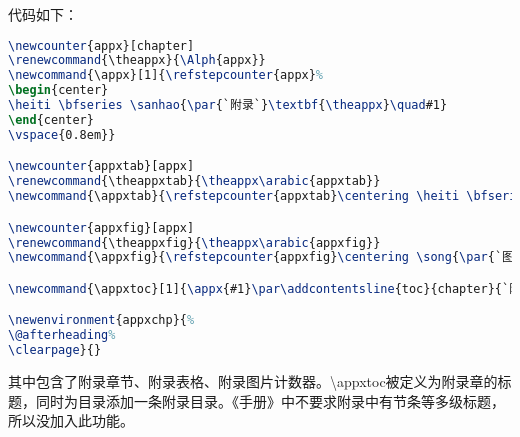 代码如下：

\begin{lstlisting}[language=TeX]
\newcounter{appx}[chapter]
\renewcommand{\theappx}{\Alph{appx}}
\newcommand{\appx}[1]{\refstepcounter{appx}%
\begin{center}
\heiti \bfseries \sanhao{\par{`附录`}\textbf{\theappx}\quad#1}
\end{center}
\vspace{0.8em}}

\newcounter{appxtab}[appx]
\renewcommand{\theappxtab}{\theappx\arabic{appxtab}}
\newcommand{\appxtab}{\refstepcounter{appxtab}\centering \heiti \bfseries {\par{`表`\hspace{0.2em}}\theappxtab}\quad}

\newcounter{appxfig}[appx]
\renewcommand{\theappxfig}{\theappx\arabic{appxfig}}
\newcommand{\appxfig}{\refstepcounter{appxfig}\centering \song{\par{`图`\hspace{0.2em}}\theappxfig\quad}}

\newcommand{\appxtoc}[1]{\appx{#1}\par\addcontentsline{toc}{chapter}{`附录`\theappx}}

\newenvironment{appxchp}{%
\@afterheading%
\clearpage}{}
\end{lstlisting}

其中包含了附录章节、附录表格、附录图片计数器。\textbackslash appxtoc被定义为附录章的标题，同时为目录添加一条附录目录。《手册》中不要求附录中有节条等多级标题，所以没加入此功能。
